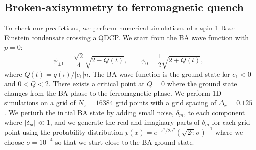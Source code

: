 \subsection{Broken-axisymmetry to ferromagnetic quench}
To check our predictions, we perform numerical simulations of a spin-1
Bose-Einstein condensate crossing a QDCP\@.
We start from the BA wave function with \( p=0 \):
\begin{equation}
    \psi_{\pm 1} = \frac{\sqrt{2}}{4}\sqrt{2 - Q(t)}, \qquad
    \psi_0 = \frac{1}{2}\sqrt{2 + Q(t)},
    \label{eq: BA-initial-wavefunction}
\end{equation}
where \(Q(t)=q(t)/|c_1|n\).
The BA wave function is the ground state for \(c_1 < 0\) and \(0 < Q < 2\).
There exists a critical point at \( Q = 0 \) where the ground state changes from
the BA phase to the ferromagnetic phase.
We perform 1D simulations on a grid of \(N_x = 16384\) grid points with a grid
spacing of \(\Delta_x = 0.125\).
We perturb the initial BA state by adding small noise, \(\delta_m\), to each
component where \(|\delta_m| \ll 1\), and we generate the real and imaginary
parts of \(\delta_m\) for each grid point using the probability distribution
\(p(x) = e^{-x^2/2\sigma^2}{(\sqrt{2\pi}\sigma)}^{-1}\) where we choose
\(\sigma=10^{-4}\) so that we start close to the BA ground state.

